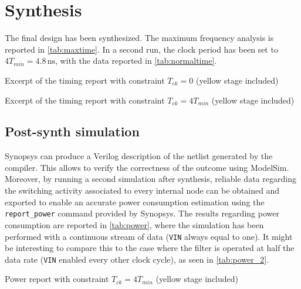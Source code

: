 \section{Synthesis}
The final design has been synthesized. The maximum frequency analysis is reported in \autoref{tab:maxtime}. In a second run, the clock period has been set to $4T_{min} = 4.8\,\textrm{ns}$, with the data reported in \autoref{tab:normaltime}.
\begin{table}
	\parbox[t]{0.53\textwidth}{
	\centering
	
	\caption{Excerpt of the timing report with constraint $T_{ck}=0$ (yellow stage included)}
	\label{tab:maxtime}
	}
\hfill
	\parbox[t]{0.53\textwidth}{
	\centering
	
	\caption{Excerpt of the timing report with constraint $T_{ck}=4T_{min}$ (yellow stage included)}
	\label{tab:normaltime}
}

\end{table}

\subsection{Post-synth simulation}
Synopsys can produce a Verilog description of the netlist generated by the compiler. This allows to verify the correctness of the outcome using ModelSim. Moreover, by running a second simulation after synthesis, reliable data regarding the switching activity associated to every internal node can be obtained and exported to enable an accurate power consumption estimation using the \texttt{report\_power} command provided by Synopsys. The results regarding power consumption are reported in \autoref{tab:power}, where the simulation has been performed with a continuous stream of data (\texttt{VIN} always equal to one). It might be interesting to compare this to the case where the filter is operated at half the data rate (\texttt{VIN} enabled every other clock cycle), as seen in \autoref{tab:power_2}.
\begin{table}
	\centering
	
	\caption{Power report with constraint $T_{ck}=4T_{min}$ (yellow stage included)}
	\label{tab:power}
\end{table}